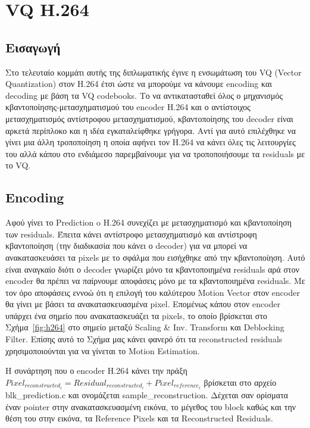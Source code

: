 ﻿\chapter{VQ H.264}
\label{chapter:chap5}

\section{Εισαγωγή}
\label{section:sect51}

\indent Στο τελευταίο κομμάτι αυτής της διπλωματικής έγινε η ενσωμάτωση του VQ (Vector Quantization) στον H.264 έτσι ώστε να μπορούμε να κάνουμε encoding και decoding με βάση τα VQ codebooks. Το να αντικατασταθεί όλος ο μηχανισμός κβαντοποίησης-μετασχηματισμού του encoder H.264 και ο αντίστοιχος μετασχηματισμός αντίστροφου μετασχηματισμού, κβαντοποίησης του decoder είναι αρκετά περίπλοκο και η ιδέα εγκαταλείφθηκε γρήγορα. Αντί για αυτό επιλέχθηκε να γίνει μια άλλη τροποποίηση η οποία αφήνει τον H.264 να κάνει όλες τις λειτουργίες του αλλά κάπου στο ενδιάμεσο παρεμβαίνουμε για να τροποποιήσουμε τα residuals με το VQ.

\section{Encoding}
\label{section:sect52}

\indent Αφού γίνει το Prediction o H.264 συνεχίζει με μετασχηματισμό και κβαντοποίηση των residuals. Έπειτα κάνει αντίστροφο μετασχηματισμό και αντίστροφη κβαντοποίηση (την διαδικασία που κάνει ο decoder) για να μπορεί να ανακατασκευάσει τα pixels με το σφάλμα που εισήχθηκε από την κβαντοποίηση. Αυτό είναι αναγκαίο διότι ο decoder γνωρίζει μόνο τα κβαντοποιημένα residuals αρά στον encoder θα πρέπει να παίρνουμε αποφάσεις μόνο με τα κβαντοποιημένα residuals. Με τον όρο αποφάσεις εννοώ ότι η επιλογή του καλύτερου Motion Vector στον encoder θα γίνει με βάσει τα ανακατασκευασμένα pixel. Επομένως κάπου στον encoder υπάρχει ένα σημείο που ανακατασκευάζει τα pixels, το οποίο βρίσκεται στο Σχήμα~\ref{fig:h264} στο σημείο μεταξύ Scaling \& Inv. Transform και Deblocking Filter. Επίσης αυτό το Σχήμα μας κάνει φανερό ότι τα reconstructed residuals χρησιμοποιούνται για να γίνεται το Motion Estimation.

\indent Η συνάρτηση που ο encoder Η.264 κάνει την πράξη $ Pixel_{reconstructed_i} = Residual_{reconstructed_i} + Pixel_{reference_i} $ βρίσκεται στο αρχείο blk\_prediction.c και ονομάζεται sample\_reconstruction. Δέχεται σαν ορίσματα έναν pointer στην ανακατασκευασμένη εικόνα, το μέγεθος του block καθώς και την θέση του στην εικόνα, τα Reference Pixels και τα Reconstructed Residuals.

